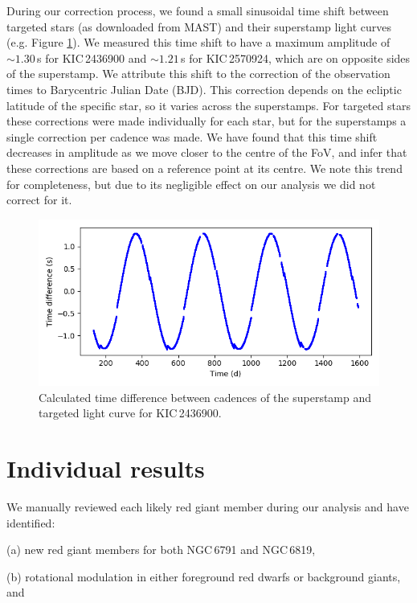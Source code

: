 During our correction process, we found a small sinusoidal time shift between targeted stars (as downloaded from MAST) and their superstamp light curves (e.g. Figure \ref{fig:keptimediff}). We measured this time shift to have a maximum amplitude of $\sim1.30$\,s for KIC\,2436900 and $\sim1.21$\,s for KIC\,2570924, which are on opposite sides of the superstamp. We attribute this shift to the correction of the observation times to Barycentric Julian Date (BJD). This correction depends on the ecliptic latitude of the specific star, so it varies across the superstamps. For targeted stars these corrections were made individually for each star, but for the superstamps a single correction per cadence was made. We have found that this time shift decreases in amplitude as we move closer to the centre of the \Kepler{} FoV, and infer that these corrections are based on a reference point at its centre. We note this trend for completeness, but due to its negligible effect on our analysis we did not correct for it.

\begin{figure}[h]
    \centering
    \includegraphics[width=\linewidth]{Chapter5/kepler_time_diff.png}
    \caption[Superstamp and targeted light curve time difference]{Calculated time difference between cadences of the superstamp and targeted light curve for KIC\,2436900.}
    \label{fig:keptimediff}
\end{figure}

\section{Individual results}

We manually reviewed each likely red giant member during our analysis and have identified: 

(a) new red giant members for both NGC\,6791 and NGC\,6819,

(b) rotational modulation in either foreground red dwarfs or background giants, and 

